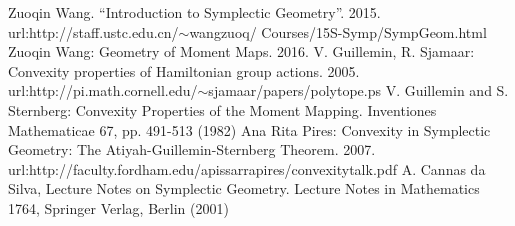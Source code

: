 \documentclass[11pt]{amsart}
\numberwithin{equation}{section}
\theoremstyle{plain}
\theoremstyle{plain}
\numberwithin{equation}{section}
\theoremstyle{remark}
\begin{document}




\begin{thebibliography}{99}


Zuoqin Wang. “Introduction to Symplectic Geometry”. 2015. url:http://staff.ustc.edu.cn/$\sim$wangzuoq/
Courses/15S-Symp/SympGeom.html
Zuoqin Wang: Geometry of Moment Maps. 2016.
V. Guillemin, R. Sjamaar: Convexity properties of Hamiltonian group actions. 2005.
url:http://pi.math.cornell.edu/$\sim$sjamaar/papers/polytope.ps
V. Guillemin and S. Sternberg: Convexity Properties of the Moment Mapping.
Inventiones Mathematicae 67, pp. 491-513 (1982)
Ana Rita Pires: Convexity in Symplectic Geometry: The
Atiyah-Guillemin-Sternberg Theorem. 2007.
url:http://faculty.fordham.edu/apissarrapires/convexitytalk.pdf
 A. Cannas da Silva, Lecture Notes on Symplectic Geometry. Lecture Notes
in Mathematics 1764, Springer Verlag, Berlin (2001)
\end{thebibliography}
\end{document}
